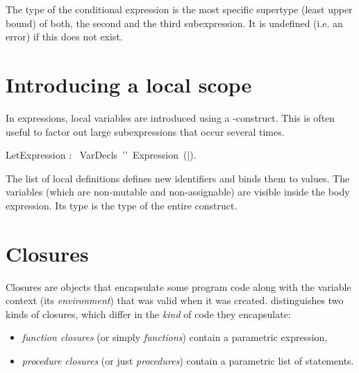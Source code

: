 The type of the conditional expression is the most specific supertype
(least upper bound) of both, the second and the third
subexpression. It is undefined (i.e. an error) if this does not exist.




\section{Introducing a local scope}\label{sect:LetExpr}


In expressions, local variables are introduced using a
\kwLet-construct. This is often useful to factor out large subexpressions
that occur several times.


\bgr
  LetExpression : \kwLet~VarDecls~'\charColon'~Expression~(\kwEnd|\kwEndLet).
\egr

The list of local definitions defines new identifiers and binds them
to values. The variables (which are non-mutable and non-assignable)
are visible inside the body expression. Its type is the type of the
entire construct.



\section{Closures}\label{sect:Closures}


Closures are objects that encapsulate some program code along with the
variable context (its {\em environment}) that was valid when it was
created. \Cal distinguishes two kinds of closures, which differ in the
{\em kind} of code they encapsulate:
\begin{itemize}
\item {\em function closures} (or simply {\em functions}) contain a
  parametric expression, 
\item {\em procedure closures} (or just {\em procedures}) contain a
  parametric list of statements.
\end{itemize}

